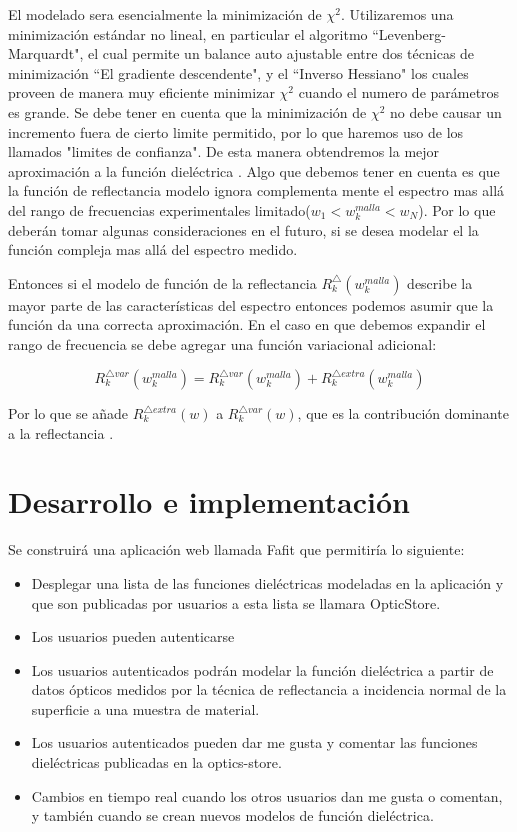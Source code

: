 \documentclass[a4paper,openright,12pt]{book}
\begin{document}
El modelado sera esencialmente la minimización de $\chi^{2}$. Utilizaremos una minimización estándar no lineal, en particular el algoritmo ``Levenberg-Marquardt", el cual permite un balance auto ajustable entre dos técnicas de minimización ``El gradiente descendente", y el ``Inverso Hessiano" los cuales proveen  de manera muy eficiente minimizar $\chi^{2}$ cuando el numero de parámetros es grande. Se debe tener en cuenta que la minimización de $\chi^{2}$ no debe causar un incremento fuera de cierto limite permitido, por lo que haremos uso de los llamados "limites de confianza". De esta manera obtendremos la mejor aproximación a la función dieléctrica \cite{guide}.  Algo que debemos tener en cuenta es que la función de reflectancia modelo ignora complementa mente el espectro mas allá del rango de frecuencias experimentales limitado($w_{1} <w_{k}^{malla} <w_{N}$). Por lo que deberán tomar algunas consideraciones en el futuro, si se desea modelar el la función compleja mas allá del espectro medido. 

Entonces si el modelo de función de la reflectancia $R_{k}^{\bigtriangleup}(w_{k}^{malla})$ describe la mayor parte de las características del espectro entonces podemos asumir que la función da una correcta aproximación. En el caso en que debemos expandir el rango de frecuencia se debe agregar una función variacional adicional\cite{guide}:

\begin{equation}
R_{k}^{\bigtriangleup var}(w_{k}^{malla})=R_{k}^{\bigtriangleup var}(w_{k}^{malla})+R_{k}^{\bigtriangleup extra}(w_{k}^{malla})
\end{equation}

Por lo que se añade $R_{k}^{\bigtriangleup extra}(w)$ a $R_{k}^{\bigtriangleup var}(w)$, que es la contribución dominante a la reflectancia \cite{guide}.\\


\chapter{Desarrollo e implementación}
Se construirá una aplicación web llamada Fafit que permitiría lo siguiente:
\begin{itemize}
\item Desplegar una lista de las funciones dieléctricas modeladas en la aplicación y que son publicadas por usuarios a esta lista se llamara OpticStore.
\item Los usuarios pueden autenticarse
\item Los usuarios autenticados podrán modelar la función dieléctrica a partir de datos ópticos medidos por la técnica de reflectancia a incidencia normal de la superficie a una muestra de material.
\item Los usuarios autenticados pueden dar me gusta y comentar las funciones dieléctricas publicadas en la optics-store.
\item Cambios en tiempo real cuando los otros usuarios dan me gusta o comentan, y también cuando se crean nuevos modelos de función dieléctrica.
\end{itemize}
\end{document}
